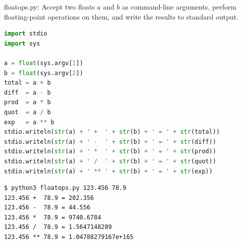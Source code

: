 \documentclass[8pt,a4paper,compress]{beamer}
\begin{document}
\begin{frame}[fragile]
\pause

\begin{framed}
\tiny floatops.py: Accept two floats $a$ and $b$ as command-line arguments, perform floating-point operations on them, and write the results to standard output.
\end{framed}

\begin{lstlisting}[language=Python,style=focusin]
import stdio
import sys

a = float(sys.argv[1])
b = float(sys.argv[2])
total = a + b
diff  = a - b
prod  = a * b
quot  = a / b
exp   = a ** b
stdio.writeln(str(a) + ' +  ' + str(b) + ' = ' + str(total))
stdio.writeln(str(a) + ' -  ' + str(b) + ' = ' + str(diff))
stdio.writeln(str(a) + ' *  ' + str(b) + ' = ' + str(prod))
stdio.writeln(str(a) + ' /  ' + str(b) + ' = ' + str(quot))
stdio.writeln(str(a) + ' ** ' + str(b) + ' = ' + str(exp))
\end{lstlisting}

\pause\bigskip

\begin{lstlisting}[language={},style=focusin]
$ python3 floatops.py 123.456 78.9
123.456 +  78.9 = 202.356
123.456 -  78.9 = 44.556
123.456 *  78.9 = 9740.6784
123.456 /  78.9 = 1.5647148289
123.456 ** 78.9 = 1.04788279167e+165
\end{lstlisting}
\end{frame}
\end{document}
